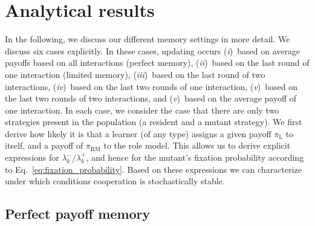 \documentclass[11pt]{article}
\def\rolemodel{\text{RM}}
\def\learner{\text{L}}
\theoremstyle{plainCl1}
\theoremstyle{plainCl2}
\begin{document}
\newpage


\section{Analytical results}
\label{section:analyticalresults}


In the following, we discuss our different memory settings in more detail. 
We discuss six cases explicitly. In these cases, updating occurs
({\it i})~based on average payoffs based on all interactions (perfect memory), 
({\it ii})~based on the last round of one interaction (limited memory), 
({\it iii})~based on the last round of two interactions,
({\it iv})~based on the last two rounds of one interaction,
({\it v})~based on the last two rounds of two interactions, and
({\it v})~based on the average payoff of one interaction.
In each case, we consider the case that there are only two strategies present in the population (a resident and a mutant strategy). 
We first derive how likely it is that a learner (of any type) assigns a given payoff $\pi_\learner$ to itself, and a payoff of $\pi_\rolemodel$ to the role model. 
This allows us to derive explicit expressions for $\lambda^-_k/\lambda^+_k$, and hence for the mutant's fixation probability according to Eq.~\eqref{eq:fixation_probability}.
Based on these expressions we can characterize under which conditions cooperation is stochastically stable.  



\subsection{Perfect payoff memory}\label{section:perfect_memory}

\end{document}
